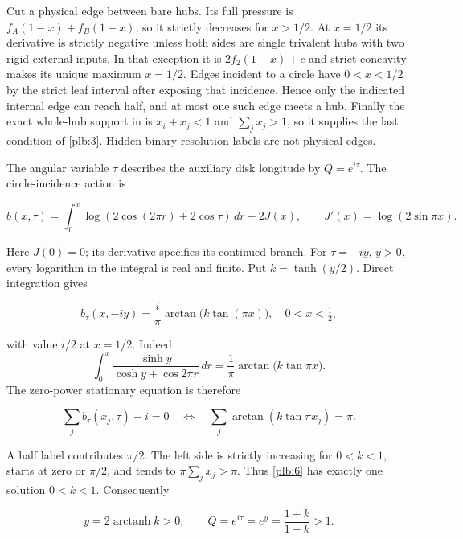 Cut a physical edge between bare hubs. Its full pressure is
$f_A(1-x)+f_B(1-x)$, so it strictly decreases for $x>1/2$.
At $x=1/2$ its derivative is strictly negative unless both sides are
single trivalent hubs with two rigid external inputs. In that exception
it is $2f_2(1-x)+c$ and strict concavity makes its unique maximum
$x=1/2$. Edges incident to a circle have $0<x<1/2$ by the strict leaf
interval after exposing that incidence. Hence only the indicated
internal edge can reach half, and at most one such edge meets a hub.
Finally the exact whole-hub support in \cite[Lemma 5.4]{Newton} is
$x_i+x_j<1$ and $\sum_jx_j>1$, so it supplies the last condition
of \eqref{plb:3}. Hidden binary-resolution labels are not physical edges.


The angular variable \(\tau\) describes the auxiliary disk longitude
by \(Q=e^{i\tau}\). The
circle-incidence action
is

\begin{equation}\label{plb:4}
b(x,\tau)=\int_0^x
       \log(2\cos(2\pi r)+2\cos\tau)\,dr-2J(x),
 \qquad J'(x)=\log(2\sin\pi x).
\end{equation}

Here \(J(0)=0\); its derivative specifies its continued branch. For \(\tau=-iy\), \(y>0\), every logarithm in the integral is real and finite. Put \(k=\tanh(y/2)\). Direct integration gives

\begin{equation}\label{plb:5}
b_\tau(x,-iy)=\frac{i}{\pi}
             \arctan\bigl(k\tan(\pi x)\bigr),
 \quad 0<x<\tfrac12,
\end{equation}

with value \(i/2\) at \(x=1/2\). Indeed
\[
 \int_0^x\frac{\sinh y}{\cosh y+\cos2\pi r}\,dr
   =\frac1\pi\arctan\bigl(k\tan\pi x\bigr).
\]
The zero-power stationary equation is therefore

\begin{equation}\label{plb:6}
\sum_jb_\tau(x_j,\tau)-i=0
 \quad\Longleftrightarrow\quad
 \sum_j\arctan(k\tan\pi x_j)=\pi.
\end{equation}

A half label contributes \(\pi/2\). The left side is strictly increasing for \(0<k<1\), starts at zero or \(\pi/2\), and tends to \(\pi\sum_jx_j>\pi\). Thus \eqref{plb:6} has exactly one solution \(0<k<1\). Consequently

\begin{equation}\label{plb:7}
y=2\operatorname{arctanh}k>0,\qquad
 Q=e^{i\tau}=e^y=\frac{1+k}{1-k}>1.
\end{equation}

